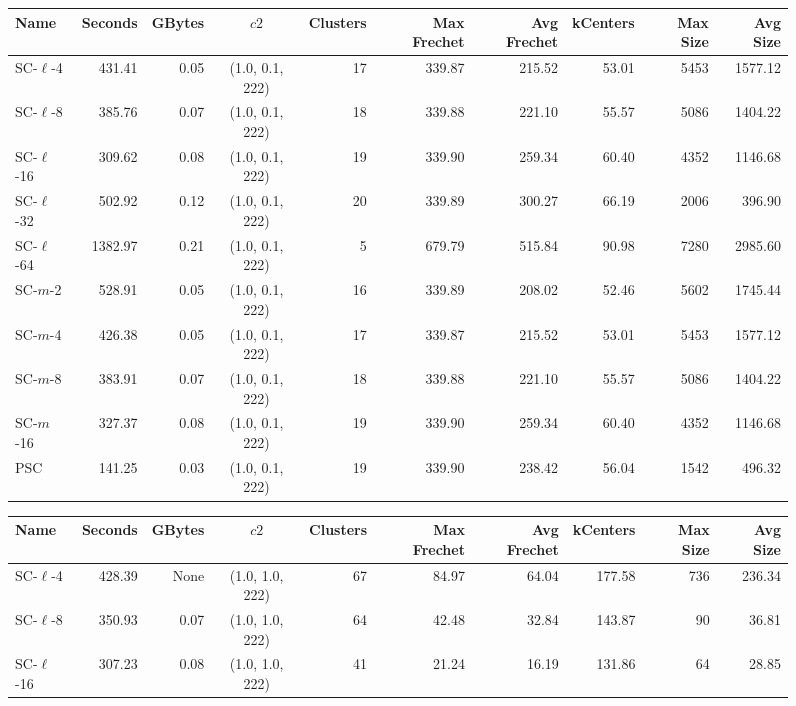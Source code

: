 \documentclass[11pt]{article}
\begin{document}
\begin{figure} \begin{center}
    \begin{minipage}{\textwidth}
    {
    \begin{tabular}{@{}lrrcrrrrrr@{}}
        \toprule
        Name & Seconds & GBytes & $c2$ & Clusters & Max Frechet & Avg Frechet & kCenters & Max Size & Avg Size\\
        \midrule
        SC-$\ell$-4 & 431.41 & 0.05 & (1.0, 0.1, 222) & 17 & 339.87 & 215.52 & 53.01 & 5453 & 1577.12\\
        SC-$\ell$-8 & 385.76 & 0.07 & (1.0, 0.1, 222) & 18 & 339.88 & 221.10 & 55.57 & 5086 & 1404.22\\
        SC-$\ell$-16 & 309.62 & 0.08 & (1.0, 0.1, 222) & 19 & 339.90 & 259.34 & 60.40 & 4352 & 1146.68\\
        SC-$\ell$-32 & 502.92 & 0.12 & (1.0, 0.1, 222) & 20 & 339.89 & 300.27 & 66.19 & 2006 & 396.90\\
        SC-$\ell$-64 & 1382.97 & 0.21 & (1.0, 0.1, 222) & 5 & 679.79 & 515.84 & 90.98 & 7280 & 2985.60\\
        SC-$m$-2 & 528.91 & 0.05 & (1.0, 0.1, 222) & 16 & 339.89 & 208.02 & 52.46 & 5602 & 1745.44\\
        SC-$m$-4 & 426.38 & 0.05 & (1.0, 0.1, 222) & 17 & 339.87 & 215.52 & 53.01 & 5453 & 1577.12\\
        SC-$m$-8 & 383.91 & 0.07 & (1.0, 0.1, 222) & 18 & 339.88 & 221.10 & 55.57 & 5086 & 1404.22\\
        SC-$m$-16 & 327.37 & 0.08 & (1.0, 0.1, 222) & 19 & 339.90 & 259.34 & 60.40 & 4352 & 1146.68\\
        PSC & 141.25 & 0.03 & (1.0, 0.1, 222) & 19 & 339.90 & 238.42 & 56.04 & 1542 & 496.32\\
        \bottomrule
    \end{tabular}}
    {
    \begin{tabular}{@{}lrrcrrrrrr@{}}
        \toprule
        Name & Seconds & GBytes & $c2$ & Clusters & Max Frechet & Avg Frechet & kCenters & Max Size & Avg Size\\
        \midrule
        SC-$\ell$-4 & 428.39 & None & (1.0, 1.0, 222) & 67 & 84.97 & 64.04 & 177.58 & 736 & 236.34\\
        SC-$\ell$-8 & 350.93 & 0.07 & (1.0, 1.0, 222) & 64 & 42.48 & 32.84 & 143.87 & 90 & 36.81\\
        SC-$\ell$-16 & 307.23 & 0.08 & (1.0, 1.0, 222) & 41 & 21.24 & 16.19 & 131.86 & 64 & 28.85\\

\end{tabular}}
\end{minipage}
\end{center}
\end{figure}
\end{document}
